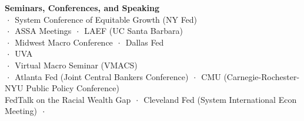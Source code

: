 \documentclass[oneside,11pt]{amsart}
\theoremstyle{definition}
\theoremstyle{remark}
\numberwithin{equation}{section}
\newcommand{\DOT}{$\hskip.1cm {\footnotesize \cdot}\hskip.2cm$}
\begin{document}
{\begin{tabbing}
%
%
%
%
%
%
\Large{\textbf{Seminars, Conferences, and Speaking}} \> \> \`  \\[0.2cm]
 \DOT System Conference of Equitable Growth (NY Fed)\\
 \DOT ASSA Meetings \DOT LAEF (UC Santa Barbara) \\
 \DOT Midwest Macro Conference \DOT Dallas Fed \\
 \DOT UVA \\
 \DOT  Virtual Macro Seminar (VMACS) \\
 \DOT Atlanta Fed (Joint Central Bankers Conference) 
              \DOT CMU (Carnegie-Rochester-NYU Public Policy Conference)  \\
\> \hskip1.35cm  FedTalk on the Racial Wealth Gap \DOT Cleveland Fed (System International Econ Meeting) \DOT \\

\end{tabbing}}
\end{document}

